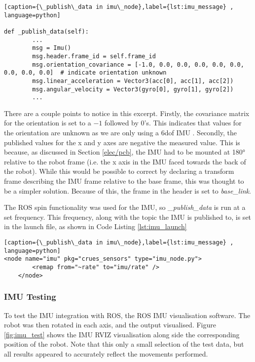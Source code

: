 \begin{lstlisting}[caption={\_publish\_data in imu\_node},label={lst:imu_message} , language=python]

def _publish_data(self):
        ...
        msg = Imu()
        msg.header.frame_id = self.frame_id
        msg.orientation_covariance = [-1.0, 0.0, 0.0, 0.0, 0.0, 0.0, 0.0, 0.0, 0.0]  # indicate orientation unknown
        msg.linear_acceleration = Vector3(acc[0], acc[1], acc[2])
        msg.angular_velocity = Vector3(gyro[0], gyro[1], gyro[2])
        ...
\end{lstlisting}

There are a couple points to notice in this excerpt. Firstly, the covariance matrix for the orientation is set to a $-1$ followed by 0's. This indicates that values for the orientation are unknown as we are only using a 6dof IMU \cite{ROSIMUMsg}. Secondly, the published values for the x and y axes are negative the measured value. This is because, as discussed in Section \ref{elec/pcb}, the IMU had to be mounted at \ang{180} relative to the robot frame (i.e. the x axis in the IMU faced towards the back of the robot). While this would be possible to correct by declaring a transform frame describing the IMU frame relative to the base frame, this was thought to be a simpler solution. Because of this, the frame in the header is set to \textit{base\_link}.

The ROS spin functionality was used for the IMU, so 
\textit{\_publish\_data} is run at a set 
frequency. This frequency, along with the topic the 
IMU is published to, is set in the launch file, as 
shown in Code Listing \ref{lst:imu_launch}

\begin{lstlisting}[caption={\_publish\_data in imu\_node},label={lst:imu_message} , language=python]
<node name="imu" pkg="crues_sensors" type="imu_node.py">
        <remap from="~rate" to="imu/rate" />
    </node>
\end{lstlisting}

\subsubsection{IMU Testing}\label{soft/odometry/imu/test}

To test the IMU integration with ROS, the ROS IMU visualisation software. The robot was then rotated in each axis, and the output visualised.  Figure \ref{fig:imu_test} shows the IMU RVIZ visualisation along side the corresponding position of the robot. Note that this only a small selection of the test data, but all results appeared to accurately reflect the movements performed.

